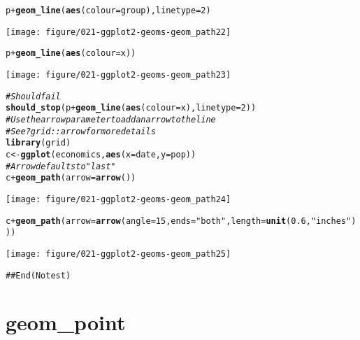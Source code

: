\documentclass[a4paper,titlepage]{tufte-handout}\usepackage[]{graphicx}\usepackage[]{color}
\makeatletter
\def\maxwidth{ %
  \ifdim\Gin@nat@width>\linewidth
    \linewidth
  \else
    \Gin@nat@width
  \fi
}
\newcommand{\hlnum}[1]{\textcolor[rgb]{0.686,0.059,0.569}{#1}}%
\newcommand{\hlstr}[1]{\textcolor[rgb]{0.192,0.494,0.8}{#1}}%
\newcommand{\hlcom}[1]{\textcolor[rgb]{0.678,0.584,0.686}{\textit{#1}}}%
\newcommand{\hlopt}[1]{\textcolor[rgb]{0,0,0}{#1}}%
\newcommand{\hlstd}[1]{\textcolor[rgb]{0.345,0.345,0.345}{#1}}%
\newcommand{\hlkwb}[1]{\textcolor[rgb]{0.69,0.353,0.396}{#1}}%
\newcommand{\hlkwc}[1]{\textcolor[rgb]{0.333,0.667,0.333}{#1}}%
\newcommand{\hlkwd}[1]{\textcolor[rgb]{0.737,0.353,0.396}{\textbf{#1}}}%
\newenvironment{kframe}{%
 \def\at@end@of@kframe{}%
 \ifinner\ifhmode%
  \def\at@end@of@kframe{\end{minipage}}%
  \begin{minipage}{\columnwidth}%
 \fi\fi%
 \def\FrameCommand##1{\hskip\@totalleftmargin \hskip-\fboxsep
 \colorbox{shadecolor}{##1}\hskip-\fboxsep
     \hskip-\linewidth \hskip-\@totalleftmargin \hskip\columnwidth}%
 \MakeFramed {\advance\hsize-\width
   \@totalleftmargin\z@ \linewidth\hsize
   \@setminipage}}%
 {\par\unskip\endMakeFramed%
 \at@end@of@kframe}
\newenvironment{knitrout}{}{} %
\makeatother
\begin{document}
\begin{knitrout}
\begin{kframe}
\begin{alltt}
\hlstd{p} \hlopt{+} \hlkwd{geom_line}\hlstd{(}\hlkwd{aes}\hlstd{(}\hlkwc{colour} \hlstd{= group),} \hlkwc{linetype} \hlstd{=} \hlnum{2}\hlstd{)}
\end{alltt}
\end{kframe}
\texttt{[image: figure/021-ggplot2-geoms-geom\_path22]} 
\begin{kframe}\begin{alltt}
\hlstd{p} \hlopt{+} \hlkwd{geom_line}\hlstd{(}\hlkwd{aes}\hlstd{(}\hlkwc{colour} \hlstd{= x))}
\end{alltt}
\end{kframe}
\texttt{[image: figure/021-ggplot2-geoms-geom\_path23]} 
\begin{kframe}\begin{alltt}
\hlcom{# Should fail}
\hlkwd{should_stop}\hlstd{(p} \hlopt{+} \hlkwd{geom_line}\hlstd{(}\hlkwd{aes}\hlstd{(}\hlkwc{colour} \hlstd{= x),} \hlkwc{linetype}\hlstd{=}\hlnum{2}\hlstd{))}
\hlcom{# Use the arrow parameter to add an arrow to the line}
\hlcom{# See ?grid::arrow for more details}
\hlkwd{library}\hlstd{(grid)}
\hlstd{c} \hlkwb{<-} \hlkwd{ggplot}\hlstd{(economics,} \hlkwd{aes}\hlstd{(}\hlkwc{x} \hlstd{= date,} \hlkwc{y} \hlstd{= pop))}
\hlcom{# Arrow defaults to "last"}
\hlstd{c} \hlopt{+} \hlkwd{geom_path}\hlstd{(}\hlkwc{arrow} \hlstd{=} \hlkwd{arrow}\hlstd{())}
\end{alltt}
\end{kframe}
\texttt{[image: figure/021-ggplot2-geoms-geom\_path24]} 
\begin{kframe}\begin{alltt}
\hlstd{c} \hlopt{+} \hlkwd{geom_path}\hlstd{(}\hlkwc{arrow} \hlstd{=} \hlkwd{arrow}\hlstd{(}\hlkwc{angle} \hlstd{=} \hlnum{15}\hlstd{,} \hlkwc{ends} \hlstd{=} \hlstr{"both"}\hlstd{,} \hlkwc{length} \hlstd{=} \hlkwd{unit}\hlstd{(}\hlnum{0.6}\hlstd{,} \hlstr{"inches"}\hlstd{)))}
\end{alltt}
\end{kframe}
\texttt{[image: figure/021-ggplot2-geoms-geom\_path25]} 
\begin{kframe}\begin{alltt}
## End(No test)


\end{alltt}
\end{kframe}
\end{knitrout}



\section{geom\_point}
\end{document}
